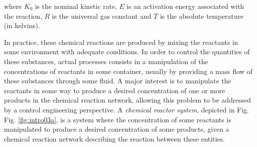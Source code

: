 \documentclass[a4paper,11pt]{book}
\numberwithin{figure}{chapter}
\numberwithin{equation}{chapter}
\numberwithin{table}{chapter}
\theoremstyle{definition}
\begin{document}
\noindent where $K_0$ is the nominal kinetic rate, $E$ is an activation energy associated with the reaction, $R$ is the universal gas constant and $T$ is the absolute temperature (in kelvins).

In practice, these chemical reactions are produced by mixing the reactants in some environment with adequate conditions. In order to control the quantities of these substances, actual processes consists in a manipulation of the concentrations of reactants in some container, usually by providing a mass flow of these substances through some fluid. A major interest is to manipulate the reactants in some way to produce a desired concentration of one or more products in the chemical reaction network, allowing this problem to be addressed by a control engineering perspective. A \textit{chemical reactor system}, depicted in Fig. Fig. \ref{fig:intro03a}, is a system where the concentration of some reactants is manipulated to produce a desired concentration of some products, given a chemical reaction network describing the reaction between these entities.
\end{document}

